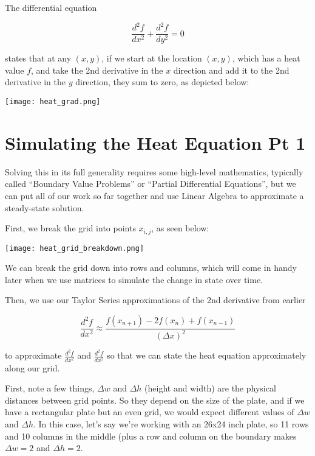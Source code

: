 \documentclass{ximera}
\begin{document}
The differential equation 

$$\frac{d^2f}{dx^2}+\frac{d^2f}{dy^2}=0$$

states that at any $(x,y)$, if we start at the location $(x,y)$, which has a heat value $f$, and take the 2nd derivative in the $x$ direction and add it to the 2nd derivative in the $y$ direction, they sum to zero, as depicted below:

\begin{center}
    \texttt{[image: heat\_grad.png]}
\end{center}

\section{Simulating the Heat Equation Pt 1}

Solving this in its full generality requires some high-level mathematics, typically called  ``Boundary Value Problems'' or ``Partial Differential Equations'', but we can put all of our work so far together and use Linear Algebra to approximate a steady-state solution.

First, we break the grid into points $x_{i,j}$, as seen below:


\begin{center}
    \texttt{[image: heat\_grid\_breakdown.png]}
\end{center}

We can break the grid down into rows and columns, which will come in handy later when we use matrices to simulate the change in state over time.

Then, we use our Taylor Series approximations of the 2nd derivative from earlier 

$$\frac{d^2f}{dx^2}\approx \frac{f(x_{n+1})-2f(x_n)+f(x_{n-1})}{\left(\Delta x\right)^2}$$

to approximate $\frac{d^2f}{dx^2}$ and $\frac{d^2f}{dx^2}$ so that we can state the heat equation approximately along our grid. 

First, note a few things, $\Delta w$ and $\Delta h$ (height and width) are the physical distances between grid points. So they depend on the size of the plate, and if we have a rectangular plate but an even grid, we would expect different values of $\Delta w$ and $\Delta h$. In this case, let's say we're working with an 26x24 inch plate, so 11 rows and 10 columns in the middle (plus a row and column on the boundary makes $\Delta w=2$ and $\Delta h=2$.
\end{document}
